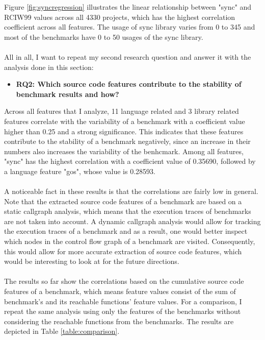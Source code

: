 \documentclass{seal_thesis}
\begin{document}
\noindent Figure \ref{fig:syncregression} illustrates the linear relationship between "sync" and RCIW99 values across all 4330 projects, which has the highest correlation coefficient across all features. The usage of sync library varies from 0 to 345 and most of the benchmarks have 0 to 50 usages of the sync library.\\
\\
All in all, I want to repeat my second research question and answer it with the analysis done in this section:

\begin{itemize}
	\item \textbf{RQ2: Which source code features contribute to the stability of benchmark results and how?}
\end{itemize}

\noindent Across all features that I analyze, 11 language related and 3 library related features correlate with the variability of a benchmark with a coefficient value higher than 0.25 and a strong significance. This indicates that these features contribute to the stability of a benchmark negatively, since an increase in their numbers also increases the variability of the benhcmark. Among all features, "sync" has the highest correlation with a coefficient value of 0.35690, followed by a language feature "gos", whose value is 0.28593.\\
\\
A noticeable fact in these results is that the correlations are fairly low in general. Note that the extracted source code features of a benchmark are based on a static callgraph analysis, which means that the execution traces of benchmarks are not taken into account. A dynamic callgraph analysis would allow for tracking the execution traces of a benchmark and as a result, one would better inspect which nodes in the control flow graph of a benchmark are visited. Consequently, this would allow for more accurate extraction of source code features, which would be interesting to look at for the future directions.\\
\\
The results so far show the correlations based on the cumulative source code features of a benchmark, which means feature values consist of the sum of benchmark's and its reachable functions' feature values. For a comparison, I repeat the same analysis using only the features of the benchmarks without considering the reachable functions from the benchmarks. The results are depicted in Table \ref{table:comparison}.
\end{document}
